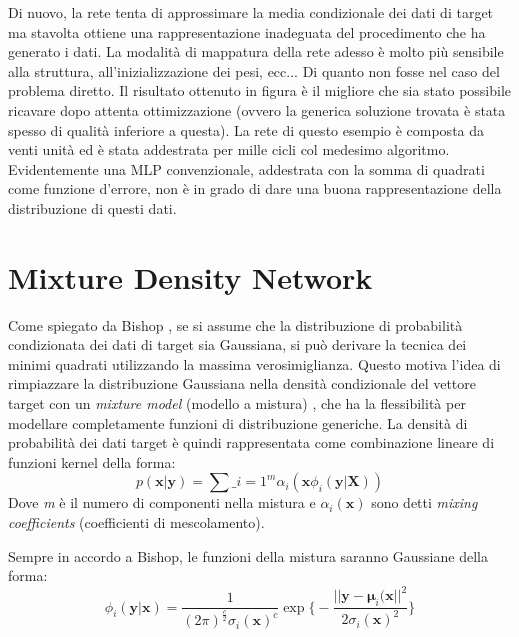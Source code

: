 Di nuovo, la rete tenta di approssimare la media condizionale dei dati di target ma stavolta ottiene una rappresentazione inadeguata del procedimento che ha generato i dati. La modalità di mappatura della rete adesso è molto più sensibile alla struttura, all'inizializzazione dei pesi, ecc... Di quanto non fosse nel caso del problema diretto. Il risultato ottenuto in figura è il migliore che sia stato possibile ricavare dopo attenta ottimizzazione (ovvero la generica soluzione trovata è stata spesso di qualità inferiore a questa). La rete di questo esempio è composta da venti unità ed è stata addestrata per mille cicli col medesimo algoritmo. Evidentemente una MLP convenzionale, addestrata con la somma di quadrati come funzione d'errore, non è in grado di dare una buona rappresentazione della distribuzione di questi dati.
\section{Mixture Density Network} %
\label{sec:mdn}
Come spiegato da Bishop \cite{gmm}, se si assume che la distribuzione di probabilità condizionata dei dati di target sia Gaussiana, si può derivare la tecnica dei minimi quadrati utilizzando la massima verosimiglianza. Questo motiva l'idea di rimpiazzare la distribuzione Gaussiana nella densità condizionale del vettore target con un \textit{mixture model} (modello a mistura) \cite{mixture}, che ha la flessibilità per modellare completamente funzioni di distribuzione generiche. La densità di probabilità dei dati target è quindi rappresentata come combinazione lineare di funzioni kernel della forma:
\begin{equation}
	\label{density}
	p(\boldsymbol{x} | \boldsymbol{y}) = \sum\_{i=1}^m \alpha_i(\boldsymbol{x}\phi_i(\boldsymbol{y} | \boldsymbol{X}))
\end{equation}
Dove \textit{m} è il numero di componenti nella mistura e $\alpha_i(\boldsymbol{x})$ sono detti \textit{mixing coefficients} (coefficienti di mescolamento).

Sempre in accordo a Bishop, le funzioni della mistura saranno Gaussiane della forma:
\begin{equation}
	\label{kernel}
	\phi_i(\boldsymbol{y} | \boldsymbol{x}) = \frac{1}{(2\pi)^{\frac{c}{2}}\sigma_i(\boldsymbol{x})^c} \exp\bigg\{-\frac{||\boldsymbol{y} - \boldsymbol{\mu}_i(\boldsymbol{x}||^2}{2\sigma_i(\boldsymbol{x})^2}\bigg\}
\end{equation}


